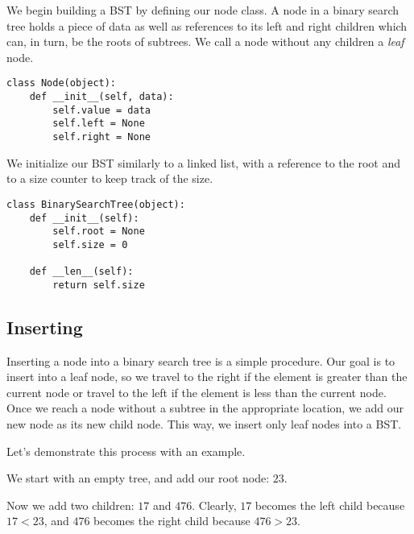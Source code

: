 We begin building a BST by defining our node class.
A node in a binary search tree holds a piece of data as well as references to its left and right children which can, in turn, be the roots of subtrees.
We call a node without any children a \emph{leaf} node.
\begin{lstlisting}
class Node(object):
    def __init__(self, data):
        self.value = data
        self.left = None
        self.right = None
\end{lstlisting}
We initialize our BST similarly to a linked list, with a reference to the root and to a size counter to keep track of the size.
\begin{lstlisting}
class BinarySearchTree(object):
    def __init__(self):
        self.root = None
        self.size = 0

    def __len__(self):
        return self.size
\end{lstlisting}

\subsection*{Inserting}
Inserting a node into a binary search tree is a simple procedure.
Our goal is to insert into a leaf node, so we travel to the right if the element is greater than the current node or travel to the left if the element is less than the current node.
Once we reach a node without a subtree in the appropriate location, we add our new node as its new child node.
This way, we insert only leaf nodes into a BST.

Let's demonstrate this process with an example.

\begin{minipage}{0.35\textwidth}
\end{minipage}\hfill
\begin{minipage}{0.55\textwidth}
    We start with an empty tree, and add our root node: $23$.
\end{minipage}

\begin{minipage}{0.35\textwidth}
\end{minipage}\hfill
\begin{minipage}{0.55\textwidth}
    Now we add two children: $17$ and $476$.
    Clearly, $17$ becomes the left child because $17 < 23$, and $476$ becomes the right child because $476 > 23$.
\end{minipage}

